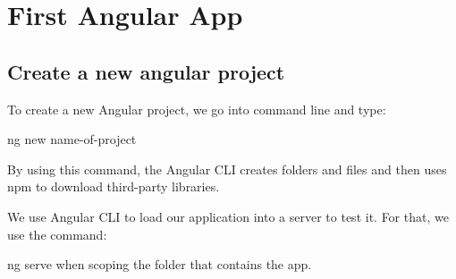 \chapter{First Angular App}
\section{Create a new angular project}
To create a new Angular project, we go into command line and type:

ng new name-of-project

By using this command, the Angular CLI creates folders and files and then uses npm to download third-party libraries.

We use Angular CLI to load our application into a server to test it. For that, we use the command:

ng serve when scoping the folder that contains the app.
